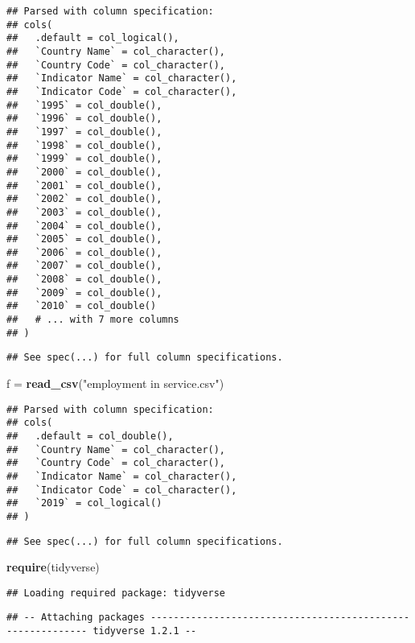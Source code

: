 \documentclass[ignorenonframetext,]{beamer}
\newenvironment{Shaded}{\begin{snugshade}}{\end{snugshade}}
\newcommand{\KeywordTok}[1]{\textcolor[rgb]{0.13,0.29,0.53}{\textbf{#1}}}
\newcommand{\NormalTok}[1]{#1}
\newcommand{\StringTok}[1]{\textcolor[rgb]{0.31,0.60,0.02}{#1}}
\begin{document}
\begin{frame}[fragile]
\begin{verbatim}
## Parsed with column specification:
## cols(
##   .default = col_logical(),
##   `Country Name` = col_character(),
##   `Country Code` = col_character(),
##   `Indicator Name` = col_character(),
##   `Indicator Code` = col_character(),
##   `1995` = col_double(),
##   `1996` = col_double(),
##   `1997` = col_double(),
##   `1998` = col_double(),
##   `1999` = col_double(),
##   `2000` = col_double(),
##   `2001` = col_double(),
##   `2002` = col_double(),
##   `2003` = col_double(),
##   `2004` = col_double(),
##   `2005` = col_double(),
##   `2006` = col_double(),
##   `2007` = col_double(),
##   `2008` = col_double(),
##   `2009` = col_double(),
##   `2010` = col_double()
##   # ... with 7 more columns
## )
\end{verbatim}

\begin{verbatim}
## See spec(...) for full column specifications.
\end{verbatim}

\begin{Shaded}
\begin{Highlighting}[]
\NormalTok{f =}\StringTok{ }\KeywordTok{read_csv}\NormalTok{(}\StringTok{"employment in service.csv"}\NormalTok{)}
\end{Highlighting}
\end{Shaded}

\begin{verbatim}
## Parsed with column specification:
## cols(
##   .default = col_double(),
##   `Country Name` = col_character(),
##   `Country Code` = col_character(),
##   `Indicator Name` = col_character(),
##   `Indicator Code` = col_character(),
##   `2019` = col_logical()
## )
\end{verbatim}

\begin{verbatim}
## See spec(...) for full column specifications.
\end{verbatim}

\begin{Shaded}
\begin{Highlighting}[]
\KeywordTok{require}\NormalTok{(tidyverse)}
\end{Highlighting}
\end{Shaded}

\begin{verbatim}
## Loading required package: tidyverse
\end{verbatim}

\begin{verbatim}
## -- Attaching packages ----------------------------------------------------------- tidyverse 1.2.1 --
\end{verbatim}


\end{frame}
\end{document}
